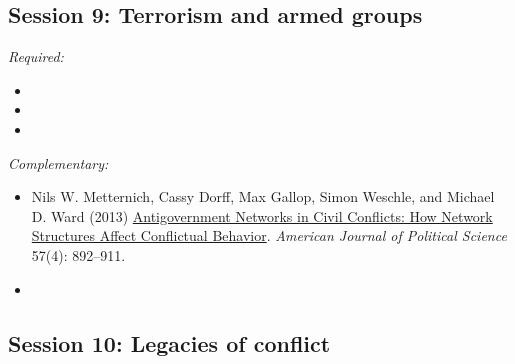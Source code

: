 \documentclass[12pt, a4paper]{article}
\begin{document}
\vspace{20pt}
\hline
\subsection*{Session 9: Terrorism and armed groups}

\noindent\textit{Required:}









\begin{itemize}
  \item
  \item
  \item
\end{itemize}

\noindent\textit{Complementary:}

\begin{itemize}
  \item Nils W. Metternich, Cassy Dorff, Max Gallop, Simon Weschle, and Michael D. Ward (2013) \href{https://doi.org/10.1111/ajps.12039}{Antigovernment Networks in Civil Conflicts: How Network Structures Affect Conflictual Behavior}. \textit{American Journal of Political Science} 57(4): 892--911.
  \item
\end{itemize}

\vspace{20pt}
\hline
\subsection*{Session 10: Legacies of conflict}
\end{document}
